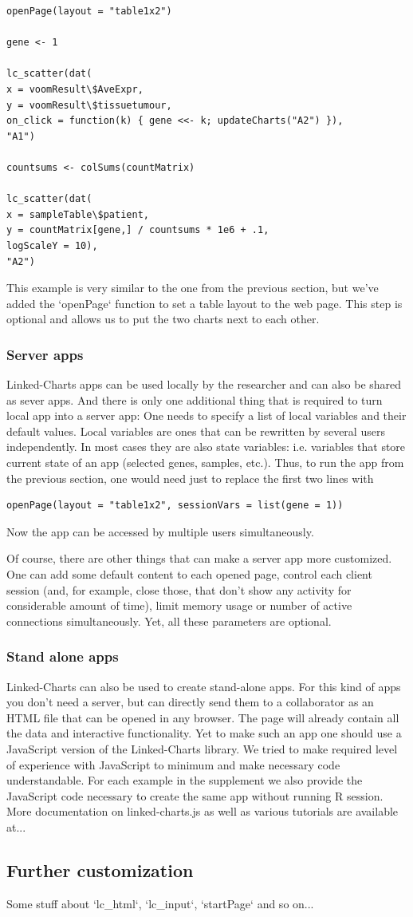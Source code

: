\documentclass[twocolumn,10pt]{article}
\begin{document}
\begin{verbatim}
openPage(layout = "table1x2")

gene <- 1

lc_scatter(dat(
x = voomResult\$AveExpr,
y = voomResult\$tissuetumour,
on_click = function(k) { gene <<- k; updateCharts("A2") }),
"A1")

countsums <- colSums(countMatrix)

lc_scatter(dat(
x = sampleTable\$patient,
y = countMatrix[gene,] / countsums * 1e6 + .1,
logScaleY = 10),
"A2")
\end{verbatim}

This example is very similar to the one from the previous section, but we've added the `openPage` function to set a table layout to the web page. This step is optional and allows us to put the two charts next to each other.

\subsubsection{Server apps}
Linked-Charts apps can be used locally by the researcher and can also be shared as sever apps. And there is only one additional thing that is required to turn local app into a server app: One needs to specify a list of local variables and their default values. Local variables are ones that can be rewritten by several users independently. In most cases they are also state variables: i.e. variables that store current state of an app (selected genes, samples, etc.). Thus, to run the app from the previous section, one would need just to replace the first two lines with
\begin{verbatim}
openPage(layout = "table1x2", sessionVars = list(gene = 1))
\end{verbatim}

Now the app can be accessed by multiple users simultaneously.

Of course, there are other things that can make a server app more customized. One can add some default content to each opened page, control each client session (and, for example, close those, that don't show any activity for considerable amount of time), limit memory usage or number of active connections simultaneously. Yet, all these parameters are optional.

\subsubsection{Stand alone apps}
Linked-Charts can also be used to create stand-alone apps. For this kind of apps you don't need a server, but can directly send them to a collaborator as an HTML file that can be opened in any browser. The page will already contain all the data and interactive functionality. Yet to make such an app one should use a JavaScript version of the Linked-Charts library. We tried to make required level of experience with JavaScript to minimum and make necessary code understandable. For each example in the supplement we also provide the JavaScript code necessary to create the same app without running R session. More documentation on linked-charts.js as well as various tutorials are available at...

\subsection{Further customization}
Some stuff about `lc_html`, `lc_input`, `startPage` and so on...
\end{document}
